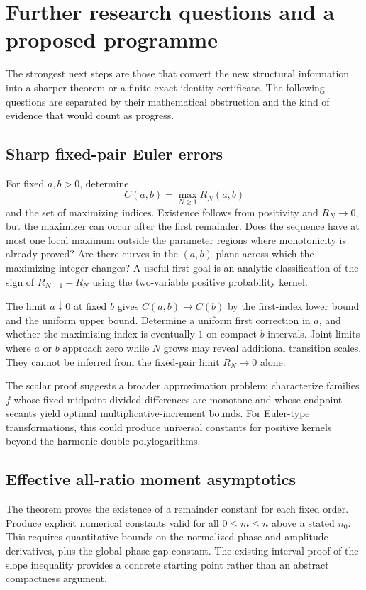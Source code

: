 \section{Further research questions and a proposed programme}
\label{sec:agenda}

The strongest next steps are those that convert the new structural
information into a sharper theorem or a finite exact identity
certificate. The following questions are separated by their mathematical
obstruction and the kind of evidence that would count as progress.

\subsection{Sharp fixed-pair Euler errors}

For fixed $a,b>0$, determine
\[
 C(a,b)=\max_{N\ge1}R_N(a,b)
\]
and the set of maximizing indices. Existence follows from positivity and
$R_N\to0$, but the maximizer can occur after the first remainder.
Does the sequence have at most one local maximum outside the parameter
regions where monotonicity is already proved? Are there curves in the
$(a,b)$ plane across which the maximizing integer changes? A useful
first goal is an analytic classification of the sign of $R_{N+1}-R_N$
using the two-variable positive probability kernel.

The limit $a\downarrow0$ at fixed $b$ gives $C(a,b)\to C(b)$ by the
first-index lower bound and the uniform upper bound. Determine
a uniform first correction in $a$, and whether the maximizing index is
eventually $1$ on compact $b$ intervals. Joint limits where $a$ or $b$
approach zero while $N$ grows may reveal additional transition scales.
They cannot be inferred from the fixed-pair limit $R_N\to0$ alone.

The scalar proof suggests a broader approximation problem: characterize
families $f$ whose fixed-midpoint divided differences are monotone and
whose endpoint secants yield optimal multiplicative-increment bounds.
For Euler-type transformations, this could produce universal constants
for positive kernels beyond the harmonic double polylogarithms.

\subsection{Effective all-ratio moment asymptotics}

The theorem proves the existence of a remainder constant for each fixed
order. Produce explicit numerical constants valid for all $0\le m\le n$
above a stated $n_0$. This requires quantitative bounds on the normalized
phase and amplitude derivatives, plus the global phase-gap constant.
The existing interval proof of the slope inequality provides a concrete
starting point rather than an abstract compactness argument.

